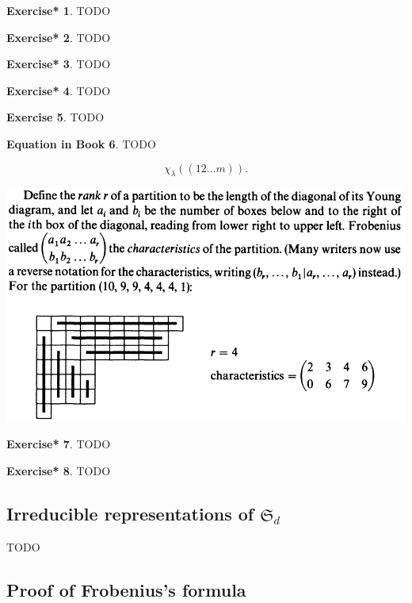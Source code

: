 \documentclass[12pt, letterpaper]{article}
\newcommand{\red}[1]{{\color{red} #1}}
\theoremstyle{definition}
\theoremstyle{remark}
\theoremstyle{definition}
\newtheorem{exe}{Exercise}[section]
\newtheorem{exe*}[exe]{Exercise*}
\newtheorem{eq}[exe]{Equation in Book}
\theoremstyle{plain}
\numberwithin{equation}{section}
\begin{document}
	\begin{exe*}
		\red{TODO}
	\end{exe*}
	\begin{exe*}
		\red{TODO}
	\end{exe*}
	\begin{exe*}
	\red{TODO}
	\end{exe*}
	\begin{exe*}
	\red{TODO}
	\end{exe*}
	\begin{exe}
		\red{TODO}
	\end{exe}
	\begin{eq}
		\red{TODO}
		
		\[\chi_\lambda((12\dots m)).\]
	\end{eq}
	\begin{def*}
		
		\includegraphics[scale=0.4]{rank_characteristics}
	\end{def*}

	\begin{exe*}
		\red{TODO}
	\end{exe*}

	\begin{exe*}
		\red{TODO}
	\end{exe*}

	\subsection{Irreducible representations of $\mathfrak{S}_d$}
	
	\red{TODO}
	\subsection{Proof of Frobenius's formula}
	
\end{document}
